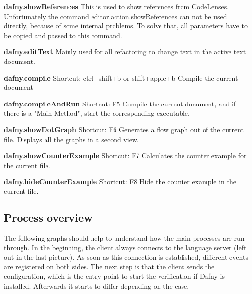 \textbf{dafny.showReferences}
This is used to show references from CodeLenses. Unfortunately the command editor.action.showReferences can not be used directly, because of some internal problems. To solve that, all parameters have to be copied and passed to this command. \newline

\textbf{dafny.editText}
Mainly used for all refactoring to change text in the active text document. \newline

\textbf{dafny.compile}
Shortcut: ctrl+shift+b or shift+apple+b
\newline
Compile the current document \newline

\textbf{dafny.compileAndRun}
Shortcut: F5
\newline
Compile the current document, and if there is a "Main Method", start the corresponding executable. \newline

\textbf{dafny.showDotGraph}
Shortcut: F6
\newline
Generates a flow graph out of the current file. Displays all the graphs in a second view. \newline

\textbf{dafny.showCounterExample}
Shortcut: F7
\newline
Calculates the counter example for the current file. \newline

\textbf{dafny.hideCounterExample}
Shortcut: F8
\newline
Hide the counter example in the current file.  \newline


\subsection{Process overview}
The following graphs should help to understand how the main processes are run through.
In the beginning, the client always connects to the language server (left out in the last picture). As soon as this connection is established, different events are registered on both sides. The next step is that the client sends the configuration, which is the entry point to start the verification if Dafny is installed. Afterwards it starts to differ depending on the case. 

